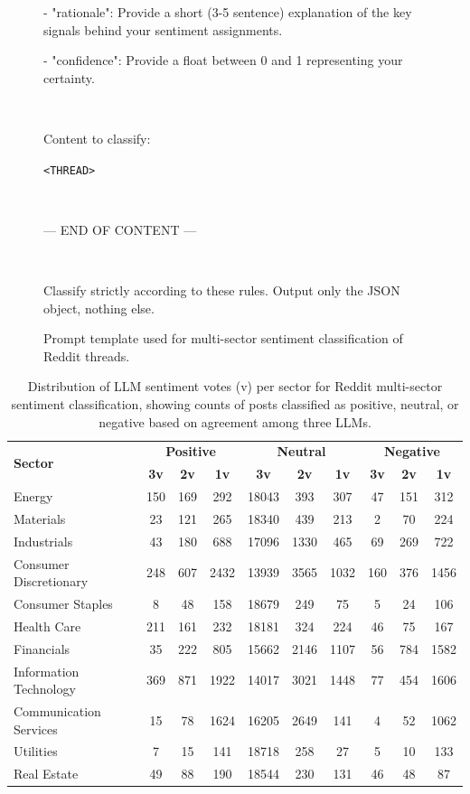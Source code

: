 \begin{figure}[H]
\begin{tcolorbox}
- "rationale": Provide a short (3-5 sentence) explanation of the key signals behind your sentiment assignments.

- "confidence": Provide a float between 0 and 1 representing your certainty.

$\ $

Content to classify:

\texttt{<THREAD>}

$\ $

--- END OF CONTENT ---

$\ $

Classify strictly according to these rules. Output only the JSON object, nothing else.
\end{tcolorbox}
\caption{Prompt template used for multi-sector sentiment classification of Reddit threads.}
\label{fig:redditprompt}
\end{figure}

\begin{table}[ht]
\centering
\caption{Distribution of LLM sentiment votes (v) per sector for Reddit multi-sector sentiment classification, showing counts of posts classified as positive, neutral, or negative based on agreement among three LLMs.}
\label{tab:redditsentiment_votes_sector}
\renewcommand{\arraystretch}{1.2}
\begin{tabular}{|l|ccc|ccc|ccc|}
\hline
\multirow{2}{*}{\textbf{Sector}} 
& \multicolumn{3}{c|}{\textbf{Positive}} 
& \multicolumn{3}{c|}{\textbf{Neutral}} 
& \multicolumn{3}{c|}{\textbf{Negative}} \\

& \textbf{3v} & \textbf{2v} & \textbf{1v}
& \textbf{3v} & \textbf{2v} & \textbf{1v}
& \textbf{3v} & \textbf{2v} & \textbf{1v} \\
\hline

Energy & 150 & 169 & 292 & 18043 & 393 & 307 & 47 & 151 & 312 \\
Materials & 23 & 121 & 265 & 18340 & 439 & 213 & 2 & 70 & 224 \\
Industrials & 43 & 180 & 688 & 17096 & 1330 & 465 & 69 & 269 & 722 \\
Consumer Discretionary & 248 & 607 & 2432 & 13939 & 3565 & 1032 & 160 & 376 & 1456 \\
Consumer Staples & 8 & 48 & 158 & 18679 & 249 & 75 & 5 & 24 & 106 \\
Health Care & 211 & 161 & 232 & 18181 & 324 & 224 & 46 & 75 & 167 \\
Financials & 35 & 222 & 805 & 15662 & 2146 & 1107 & 56 & 784 & 1582 \\
Information Technology & 369 & 871 & 1922 & 14017 & 3021 & 1448 & 77 & 454 & 1606 \\
Communication Services & 15 & 78 & 1624 & 16205 & 2649 & 141 & 4 & 52 & 1062 \\
Utilities & 7 & 15 & 141 & 18718 & 258 & 27 & 5 & 10 & 133 \\
Real Estate & 49 & 88 & 190 & 18544 & 230 & 131 & 46 & 48 & 87 \\

\hline
\end{tabular}
\end{table}

